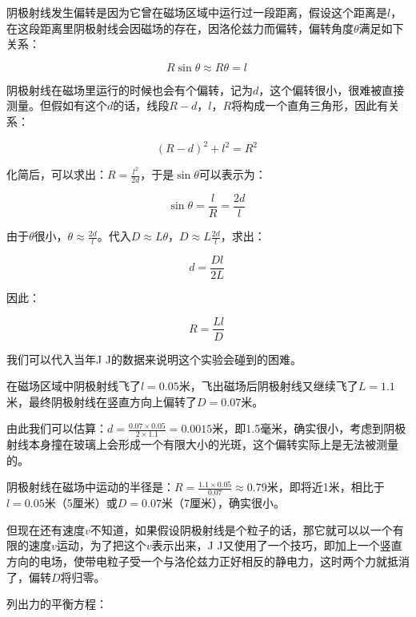 阴极射线发生偏转是因为它曾在磁场区域中运行过一段距离，假设这个距离是$l$，在这段距离里阴极射线会因磁场的存在，因洛伦兹力而偏转，偏转角度$\theta$满足如下关系：

\begin{equation}
R \sin \theta \approx R \theta = l~
\end{equation}

阴极射线在磁场里运行的时候也会有个偏转，记为$d$，这个偏转很小，很难被直接测量。但假如有这个$d$的话，线段$R - d$，$l$，$R$将构成一个直角三角形，因此有关系：

\begin{equation}
(R-d)^2 + l^2 = R^2~
\end{equation}

化简后，可以求出：$R = \frac{l^2}{2 d}$，于是$\sin \theta$可以表示为：

\begin{equation}
\sin \theta = \frac{l}{R} = \frac{2d}{l}~
\end{equation}

由于$\theta$很小，$\theta \approx \frac{2 d}{l}$。代入$D \approx L \theta$，$D \approx L \frac{2d}{l} $，求出：

\begin{equation}
 d = \frac{D l}{2 L}~
\end{equation}

因此：

\begin{equation}
R = \frac{L l }{D }~
\end{equation}

我们可以代入当年J J的数据来说明这个实验会碰到的困难。

在磁场区域中阴极射线飞了$ l = 0.05  $米，飞出磁场后阴极射线又继续飞了$ L = 1.1 $米，最终阴极射线在竖直方向上偏转了$ D = 0.07 $米。

由此我们可以估算：$d = \frac{ 0.07 \times 0.05  }{ 2 \times 1.1} = 0.0015 $米，即1.5毫米，确实很小，考虑到阴极射线本身撞在玻璃上会形成一个有限大小的光斑，这个偏转实际上是无法被测量的。

阴极射线在磁场中运动的半径是：$R = \frac{ 1.1 \times 0.05 }{ 0.07 } \approx 0.79$米，即将近1米，相比于$l = 0.05 $米（5厘米）或$D = 0.07$米（7厘米），确实很小。

但现在还有速度$v$不知道，如果假设阴极射线是个粒子的话，那它就可以以一个有限的速度$v$运动，为了把这个$v$表示出来，J J又使用了一个技巧，即加上一个竖直方向的电场，使带电粒子受一个与洛伦兹力正好相反的静电力，这时两个力就抵消了，偏转$D$将归零。

列出力的平衡方程：

